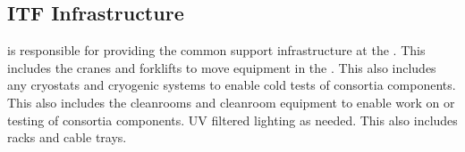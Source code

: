 \subsection{ITF Infrastructure}

 is responsible for providing the common support
infrastructure at the . This includes the cranes and
forklifts to move equipment in the . This also includes any
cryostats and cryogenic systems to enable cold tests of consortia
components. This also includes the cleanrooms and cleanroom equipment
to enable work on or testing of consortia components. UV filtered
lighting as needed. This also includes racks and cable trays.
